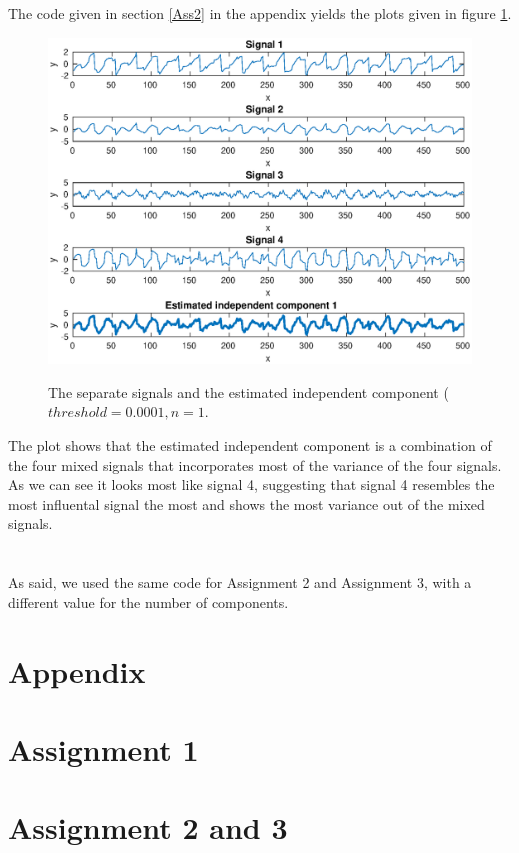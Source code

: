\documentclass[10pt]{article}
\begin{document}
\subsection{}
The code given in section \ref{Ass2} in the appendix yields the plots given in figure \ref{fig2.1}.
\begin{figure}
  \centering
  \caption{The separate signals and the estimated independent component ($threshold = 0.0001, n = 1$.}
    \includegraphics[width=\columnwidth]{Ass2.eps}
  \label{fig2.1}
\end{figure}
The plot shows that the estimated independent component is a combination of the four mixed signals that incorporates most of the variance of the four signals. As we can see it looks most like signal 4, suggesting that signal 4 resembles the most influental signal the most and shows the most variance out of the mixed signals.

\section{}
As said, we used the same code for Assignment 2 and Assignment 3, with a different value for the number of components.

\newpage
\section*{Appendix}
\appendix
\section{Assignment 1}
{\label{Ass1}}
\section{Assignment 2 and 3}
{\label{Ass2}}
\end{document}
